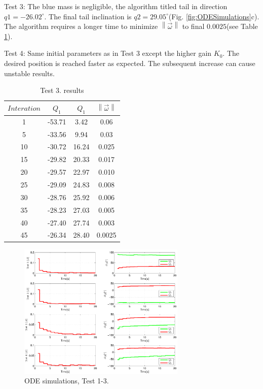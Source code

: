 Test 3: The blue mass is negligible, the algorithm titled tail in direction $q1=-26.02^{\circ}$. The final tail inclination is $q2=29.05^{\circ}$(Fig. \ref{fig:ODESimulations}c). The algorithm requires a longer time to minimize $\left \| \vec{\omega} \right \|$ to final $0.0025$(see Table \ref{tab:Simulations2}).

Test 4: Same initial parameters as in Test 3 except the higher gain $K_0$. The desired position is reached faster as expected. The subsequent increase can cause unstable results. 

\begin{table}
	\centering
\begin{tabular}{|c|c|c|c|}
	\hline
$Interation$ & $Q_1$ & $Q_1$  & $\left \| \vec{\omega} \right \|$\\
	\hline
1 & -53.71 & 3.42 & 0.06\\
5 & -33.56 & 9.94 & 0.03\\
10 & -30.72 & 16.24 &  0.025\\
15 & -29.82 & 20.33 & 0.017\\
20 & -29.57 & 22.97 &  0.010\\
25 & -29.09 & 24.83 &  0.008\\
30 & -28.76 & 25.92 &   0.006\\
35 & -28.23 & 27.03 & 0.005\\
40 & -27.40 & 27.74 &0.003\\
45 & -26.34 & 28.40 &  0.0025\\
\hline
\end{tabular}
\caption{Test 3. results}\label{tab:Simulations2}
\end{table}


\begin{figure}
	\centering
	\includegraphics[width=80mm]{./pictures/ODE_graph.pdf}
	\caption{ODE simulations, Test 1-3.}
	\label{fig:ODE graph}
\end{figure}